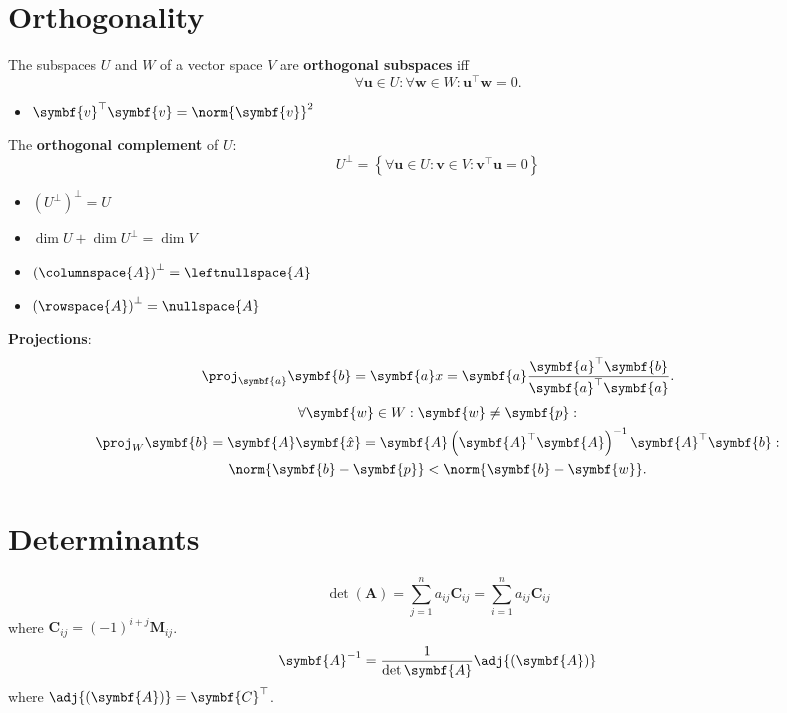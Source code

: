 \documentclass{article}
\begin{document}
\begin{minipage}[t]{62.39259259mm}
    \section*{Orthogonality}
    The subspaces \(U\) and \(W\) of a vector space \(V\) are
    \textbf{orthogonal subspaces} iff
    \begin{equation*}
        \forall \symbf{u}\in U:\forall \symbf{w}\in W:\symbf{u}^{\top}\symbf{w} = 0.
    \end{equation*}
    \begin{itemize}
        \item \(\symbf{v}^\top \symbf{v}=\norm{\symbf{v}}^2\)
    \end{itemize}
    The \textbf{orthogonal complement} of \(U\):
    \begin{equation*}
        U^{\perp} = \left\{ \forall \symbf{u}\in U:\symbf{v}\in V: \symbf{v}^{\top}\symbf{u}=0 \right\}
    \end{equation*}
    \begin{itemize}
        \item \(\left( U^{\perp} \right)^{\perp} = U\)
        \item \(\dim{U} + \dim{U^{\perp}} = \dim{V}\)
        \item \(\left( \columnspace{A} \right)^\perp = \leftnullspace{A}\)
        \item \(\left( \rowspace{A} \right)^\perp = \nullspace{A}\)
    \end{itemize}
    \textbf{Projections}:
    \begin{equation*}
        \proj_{\symbf{a}}\symbf{b}
        = \symbf{a} x
        = \symbf{a} \frac{\symbf{a}^\top \symbf{b}}{\symbf{a}^\top \symbf{a}}.
    \end{equation*}
    \begin{gather*}
        \forall \symbf{w}\in W:\symbf{w}\neq \symbf{p}: \\
        \proj_{W}\symbf{b} = \symbf{A}\symbf{\hat{x}} = \symbf{A}\left( \symbf{A}^\top \symbf{A} \right)^{-1}\symbf{A}^\top \symbf{b}: \\
        \norm{\symbf{b}-\symbf{p}}<\norm{\symbf{b}-\symbf{w}}.
    \end{gather*}
    \section*{Determinants}
    \begin{equation*}
        \det{\left( \symbf{A} \right)} = \sum_{j=1}^n a_{ij}\symbf{C}_{ij} = \sum_{i=1}^n a_{ij}\symbf{C}_{ij}
    \end{equation*}
    where \(\symbf{C}_{ij}=\left( -1 \right)^{i+j}\symbf{M}_{ij}\).
    \begin{equation*}
        \symbf{A}^{-1}=\frac{1}{\det{\symbf{A}}} \adj{\left( \symbf{A} \right)}
    \end{equation*}
    where \(\adj{\left( \symbf{A} \right)}=\symbf{C}^\top\).
\end{minipage}\hfill%
\end{document}
